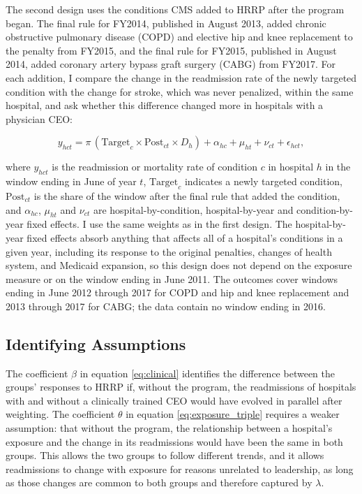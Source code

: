 \documentclass[12pt]{article}
\theoremstyle{definition}   %
\begin{document}
The second design uses the conditions CMS added to HRRP after the program began. The final rule for FY2014, published in August 2013, added chronic obstructive pulmonary disease (COPD) and elective hip and knee replacement to the penalty from FY2015, and the final rule for FY2015, published in August 2014, added coronary artery bypass graft surgery (CABG) from FY2017. For each addition, I compare the change in the readmission rate of the newly targeted condition with the change for stroke, which was never penalized, within the same hospital, and ask whether this difference changed more in hospitals with a physician CEO:

\begin{equation}
\label{eq:added}
y_{hct} = \pi\, (\text{Target}_c \times \text{Post}_{ct} \times D_h) + \alpha_{hc} + \mu_{ht} + \nu_{ct} + \epsilon_{hct},
\end{equation}

\noindent where $y_{hct}$ is the readmission or mortality rate of condition $c$ in hospital $h$ in the window ending in June of year $t$, $\text{Target}_c$ indicates a newly targeted condition, $\text{Post}_{ct}$ is the share of the window after the final rule that added the condition, and $\alpha_{hc}$, $\mu_{ht}$ and $\nu_{ct}$ are hospital-by-condition, hospital-by-year and condition-by-year fixed effects. I use the same weights as in the first design. The hospital-by-year fixed effects absorb anything that affects all of a hospital's conditions in a given year, including its response to the original penalties, changes of health system, and Medicaid expansion, so this design does not depend on the exposure measure or on the window ending in June 2011. The outcomes cover windows ending in June 2012 through 2017 for COPD and hip and knee replacement and 2013 through 2017 for CABG; the data contain no window ending in 2016.


    \subsection{Identifying Assumptions}

    The coefficient $\beta$ in equation \eqref{eq:clinical} identifies the difference between the groups' responses to HRRP if, without the program, the readmissions of hospitals with and without a clinically trained CEO would have evolved in parallel after weighting. The coefficient $\theta$ in equation \eqref{eq:exposure_triple} requires a weaker assumption: that without the program, the relationship between a hospital's exposure and the change in its readmissions would have been the same in both groups. This allows the two groups to follow different trends, and it allows readmissions to change with exposure for reasons unrelated to leadership, as long as those changes are common to both groups and therefore captured by $\lambda$.
\end{document}
